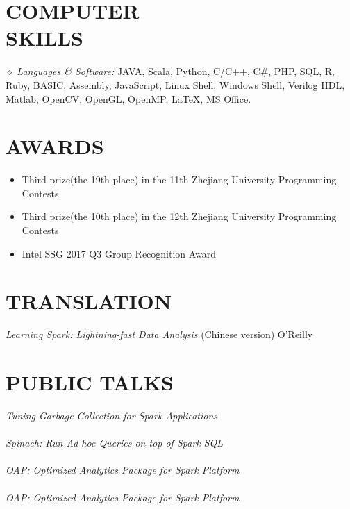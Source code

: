 \documentclass[line,margin]{res}
\begin{document}
\begin{resume}
\section{COMPUTER \\ SKILLS} {$\diamond$ \sl Languages \& Software:} JAVA, Scala, Python, C/C++, C\#, PHP, SQL, R, Ruby, BASIC, Assembly, JavaScript, Linux Shell, Windows Shell, Verilog HDL, Matlab, OpenCV, OpenGL, OpenMP, \LaTeX, MS Office. \\


\section{AWARDS}
    \begin{itemize}
            \item Third prize(the 19th place) in the 11th Zhejiang University Programming Contests
            \item Third prize(the 10th place) in the 12th Zhejiang University Programming Contests
            \item Intel SSG 2017 Q3 Group Recognition Award
    \end{itemize}

\section{TRANSLATION}
            {\sl Learning Spark: Lightning-fast Data Analysis} (Chinese version) \hfill O'Reilly

\section{PUBLIC TALKS}
            {\sl Tuning Garbage Collection for Spark Applications}\\
                \\
            {\sl Spinach: Run Ad-hoc Queries on top of Spark SQL}\\
                \\
            {\sl OAP: Optimized Analytics Package for Spark Platform}\\
                \\
            {\sl OAP: Optimized Analytics Package for Spark Platform}\\
                \\


\end{resume}
\end{document}
